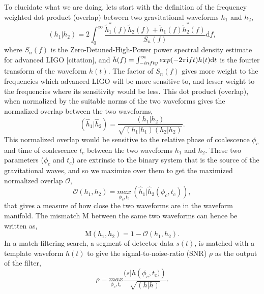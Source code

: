 \documentclass[aps,
prd,
amsmath,
amssymb,
twocolumn,
floatfix,
groupedaddress]{revtex4-1}
\newcommand{\ii}{{\rm i}}
\newcommand{\D}{\mathrm{d}}
\newcommand{\Olap}{\mathcal{O}}
\def\l({\left(}
\def\r){\right)}
\begin{document}
To elucidate what we are doing, lets start with the definition of the frequency weighted dot product (overlap) between two gravitational waveforms $h_1$ and $h_2$,
\begin{equation}\label{eq:overlap}
(h_1|h_2) = 2\int^{\infty}_0\dfrac{\tilde{h}_1^*(f)\tilde{h}_2(f) + \tilde{h}_1(f)\tilde{h}_2^*(f)}{S_n(f)}\D f,
\end{equation}
where $S_n(f)$ is the Zero-Detuned-High-Power power spectral density estimate for advanced LIGO [citation], and $\tilde{h}(f) = \int^{\infty}_{-infty}exp(-2\pi\ii ft)h(t)\D t$ is the fourier transform of the waveform $h(t)$. The factor of $S_n(f)$ gives more weight to the frequencies which advanced LIGO will be more sensitive  to, and lesser weight to the frequencies where its sensitivity would be less. This dot product (overlap), when normalized by the suitable norms of the two waveforms gives the normalized overlap between the two waveforms,
\begin{equation}
(\hat{h}_1|\hat{h}_2) = \dfrac{(h_1|h_2)}{\sqrt{(h_1|h_1)(h_2|h_2)}}.
\end{equation}
This normalized overlap would be sensitive to the relative phase of coalescence $\phi_c$ and time of coalescence $t_c$ between the two waveforms $h_1$ and $h_2$. These two parameters ($\phi_c$ and $t_c$) are extrinsic to the binary system that is the source of the gravitational waves, and so we maximize over them to get the maximized normalized overlap $\Olap$,
\begin{equation}\label{eq:maxnormolap}
\Olap(h_1,h_2) = \underset{\phi_c,t_c}{max}\,\l(\hat{h}_1|\hat{h}_2(\phi_c,t_c)\r),
\end{equation}
that gives a measure of how close the two waveforms are in the waveform manifold. The mismatch $\mathrm{M}$ between the same two waveforms can hence be written as,
\begin{equation}\label{eq:mismatch}
\mathrm{M}(h_1,h_2) = 1 - \Olap(h_1,h_2).
\end{equation}
\newline
In a match-filtering search, a segment of detector data $s(t)$, is matched with a template waveform $h(t)$ to give the signal-to-noise-ratio (SNR) $\rho$ as the output of the filter,
\begin{equation}\label{eq:SNR}
\rho = \underset{\phi_c,t_c}{max} \dfrac{(s|h\l(\phi_c,t_c)\r)}{\sqrt{(h|h)}}.
\end{equation}
\end{document}
